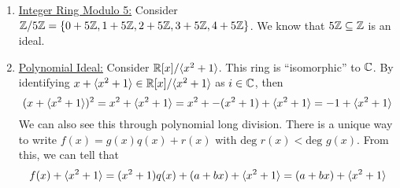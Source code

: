 \documentclass[letterpaper]{article}
\begin{document}
\begin{enumerate}
    \item \underline{Integer Ring Modulo 5:} Consider $\mathbb{Z} / 5\mathbb{Z} = \{0 + 5\mathbb{Z}, 1 + 5\mathbb{Z}, 2 + 5\mathbb{Z}, 3 + 5\mathbb{Z}, 4 + 5\mathbb{Z}\}$. We know that $5\mathbb{Z} \subseteq \mathbb{Z}$ is an ideal. 

    \item \underline{Polynomial Ideal:} Consider $\mathbb{R}[x] / \langle x^2 + 1 \rangle$. This ring is ``isomorphic'' to $\mathbb{C}$. By identifying $x + \langle x^2 + 1 \rangle \in \mathbb{R}[x] / \langle x^2 + 1 \rangle$ as $i \in \mathbb{C}$, then
    \[(x + \langle x^2 + 1 \rangle)^2 = x^2 + \langle x^2 + 1 \rangle = x^2 + -(x^2 + 1) + \langle x^2 + 1 \rangle = -1 + \langle x^2 + 1 \rangle\]
    We can also see this through polynomial long division. There is a unique way to write $f(x) = g(x)q(x) + r(x)$ with $\text{deg } r(x) < \text{deg } g(x)$. From this, we can tell that
    \[f(x) + \langle x^2 + 1 \rangle = (x^2 + 1)q(x) + (a + bx) + \langle x^2 + 1 \rangle = (a + bx) + \langle x^2 + 1 \rangle\]
    

\end{enumerate}
\end{document}
